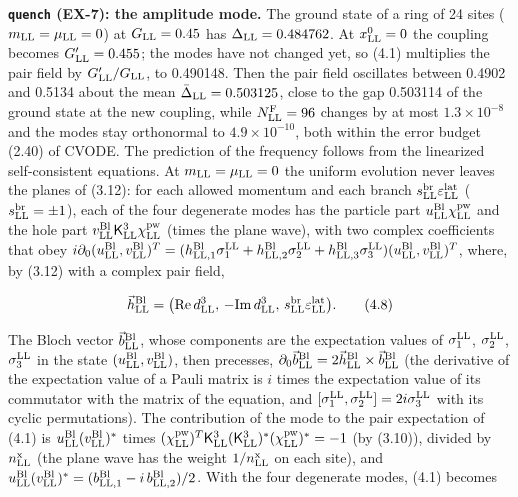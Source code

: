 \documentclass[
  10pt,
]{article}
\begin{document}
\textbf{\texttt{quench} (EX-7): the amplitude mode.} The ground state of
a ring of 24 sites (\(m_{\rm LL}=\mu_{\rm LL}=0\)) at
\(G_{\rm LL}=0.45\) has \(\Delta_{\rm LL}=0.484762\). At
\(x^0_{\rm LL}=0\) the coupling becomes \(G'_{\rm LL}=0.455\); the modes
have not changed yet, so (4.1) multiplies the pair field by
\(G'_{\rm LL}/G_{\rm LL}\), to 0.490148. Then the pair field oscillates
between 0.4902 and 0.5134 about the mean
\(\bar\Delta_{\rm LL}=0.503125\), close to the gap 0.503114 of the
ground state at the new coupling, while \(N^{\rm F}_{\rm LL}=96\)
changes by at most \(1.3\times10^{-8}\) and the modes stay orthonormal
to \(4.9\times10^{-10}\), both within the error budget (2.40) of CVODE.
The prediction of the frequency follows from the linearized
self-consistent equations. At \(m_{\rm LL}=\mu_{\rm LL}=0\) the uniform
evolution never leaves the planes of (3.12): for each allowed momentum
and each branch \(s^{\rm br}_{\rm LL}\varepsilon^{\rm lat}_{\rm LL}\)
(\(s^{\rm br}_{\rm LL}=\pm1\)), each of the four degenerate modes has
the particle part \(u^{\rm Bl}_{\rm LL}\chi^{\rm pw}_{\rm LL}\) and the
hole part
\(v^{\rm Bl}_{\rm LL}\mathsf K^3_{\rm LL}\chi^{\rm pw}_{\rm LL}\) (times
the plane wave), with two complex coefficients that obey
\(i\partial_0(u^{\rm Bl}_{\rm LL},v^{\rm Bl}_{\rm LL})^T=(h^{\rm Bl}_{{\rm LL},1}\sigma^{\rm LL}_1+h^{\rm Bl}_{{\rm LL},2}\sigma^{\rm LL}_2+h^{\rm Bl}_{{\rm LL},3}\sigma^{\rm LL}_3)(u^{\rm Bl}_{\rm LL},v^{\rm Bl}_{\rm LL})^T\),
where, by (3.12) with a complex pair field,

\[\vec h^{\rm Bl}_{\rm LL}=\big(\mathrm{Re}\,d^3_{\rm LL},\,-\mathrm{Im}\,d^3_{\rm LL},\,s^{\rm br}_{\rm LL}\varepsilon^{\rm lat}_{\rm LL}\big).\tag{4.8}\]

The Bloch vector \(\vec b^{\rm Bl}_{\rm LL}\), whose components are the
expectation values of \(\sigma^{\rm LL}_1\), \(\sigma^{\rm LL}_2\),
\(\sigma^{\rm LL}_3\) in the state
\((u^{\rm Bl}_{\rm LL},v^{\rm Bl}_{\rm LL})\), then precesses,
\(\partial_0\vec b^{\rm Bl}_{\rm LL}=2\vec h^{\rm Bl}_{\rm LL}\times\vec b^{\rm Bl}_{\rm LL}\)
(the derivative of the expectation value of a Pauli matrix is \(i\)
times the expectation value of its commutator with the matrix of the
equation, and
\([\sigma^{\rm LL}_1,\sigma^{\rm LL}_2]=2i\sigma^{\rm LL}_3\) with its
cyclic permutations). The contribution of the mode to the pair
expectation of (4.1) is \(u^{\rm Bl}_{\rm LL}(v^{\rm Bl}_{\rm LL})^*\)
times
\((\chi^{\rm pw}_{\rm LL})^T\mathsf K^3_{\rm LL}(\mathsf K^3_{\rm LL})^*(\chi^{\rm pw}_{\rm LL})^*=-1\)
(by (3.10)), divided by \(n^{\rm x}_{\rm LL}\) (the plane wave has the
weight \(1/n^{\rm x}_{\rm LL}\) on each site), and
\(u^{\rm Bl}_{\rm LL}(v^{\rm Bl}_{\rm LL})^*=(b^{\rm Bl}_{{\rm LL},1}-i\,b^{\rm Bl}_{{\rm LL},2})/2\).
With the four degenerate modes, (4.1) becomes
\end{document}
